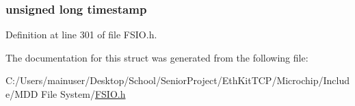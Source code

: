 \hypertarget{struct_search_rec_acba7776dcc1861edfe0e9c5736de4df8}{}
\subsubsection[{timestamp}]{\setlength{\rightskip}{0pt plus 5cm}unsigned long timestamp}\label{struct_search_rec_acba7776dcc1861edfe0e9c5736de4df8}


Definition at line 301 of file F\+S\+I\+O.\+h.



The documentation for this struct was generated from the following file\+:\begin{DoxyCompactItemize}
\item 
C\+:/\+Users/mainuser/\+Desktop/\+School/\+Senior\+Project/\+Eth\+Kit\+T\+C\+P/\+Microchip/\+Include/\+M\+D\+D File System/\hyperlink{_f_s_i_o_8h}{F\+S\+I\+O.\+h}\end{DoxyCompactItemize}
